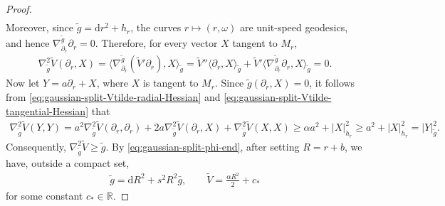 \documentclass[11pt,reqno]{amsart}
\numberwithin{equation}{section}
\theoremstyle{definition}
\theoremstyle{remark}
\newcommand{\la}{\langle}
\newcommand{\ra}{\rangle}
\newcommand{\ud}{\mathrm{d}}
\newcommand{\0}{\emptyset}
\newcommand{\bbR}{\mathbb R}
\begin{document}
\begin{proof}
\begin{align}
\end{align}
Moreover, since $\widetilde g=\ud r^2+h_r$, the curves
$r\mapsto(r,\omega)$ are unit-speed geodesics, and hence
$\nabla_{\partial_r}^{\widetilde g}\partial_r=0$. Therefore, for every
vector $X$ tangent to $M_r$,
\begin{align}
        \nabla_{\widetilde g}^2\widetilde V(\partial_r,X)
        =
        \la
        \nabla_{\partial_r}^{\widetilde g}
        (
        \widetilde V'\partial_r
        ),
        X
        \ra_{\widetilde g}=
        \widetilde V''
        \la\partial_r,X\ra_{\widetilde g}
        +
        \widetilde V'
        \la
        \nabla_{\partial_r}^{\widetilde g}\partial_r,
        X
        \ra_{\widetilde g}=
        0.
\end{align}
Now let $Y=a\partial_r+X$, where $X$ is tangent to $M_r$. Since
$\widetilde g(\partial_r,X)=0$, it follows from
\eqref{eq:gaussian-split-Vtilde-radial-Hessian} and
\eqref{eq:gaussian-split-Vtilde-tangential-Hessian} that
\begin{align}
        \nabla_{\widetilde g}^2\widetilde V(Y,Y)
        =
        a^2
        \nabla_{\widetilde g}^2\widetilde V
        (\partial_r,\partial_r)
        +
        2a
        \nabla_{\widetilde g}^2\widetilde V
        (\partial_r,X)
        +
        \nabla_{\widetilde g}^2\widetilde V(X,X)\geq
        \alpha a^2+|X|_{h_r}^2\geq
        a^2+|X|_{h_r}^2=
        |Y|_{\widetilde g}^2.
\end{align}
Consequently, $\nabla_{\widetilde g}^2\widetilde V \geq \widetilde g.$ By \eqref{eq:gaussian-split-phi-end}, after setting $R=r+b$, we have, outside
a compact set,
\begin{align}\label{eq:gaussian-split-gtilde-end}
        \widetilde g
        =
        \ud R^2+s^2R^2\bar g,
        \qquad
        \widetilde V
        =
        \frac{\alpha R^2}{2}+c_*
\end{align}
for some constant $c_*\in\bbR$.


\end{proof}
\end{document}
